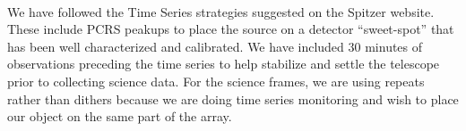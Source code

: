 \documentclass[letterpaper,12pt]{article}
\begin{document}
%
%
%

{}\\
We have followed the Time Series strategies suggested on the Spitzer website.
These include PCRS peakups to place the source on a detector ``sweet-spot'' that has been well characterized and calibrated.
We have included 30 minutes of observations preceding the time series to help stabilize and settle the telescope prior to collecting science data.
For the science frames, we are using repeats rather than dithers because we are doing time series
monitoring and wish to place our object on the same part of the
array.
\end{document}

